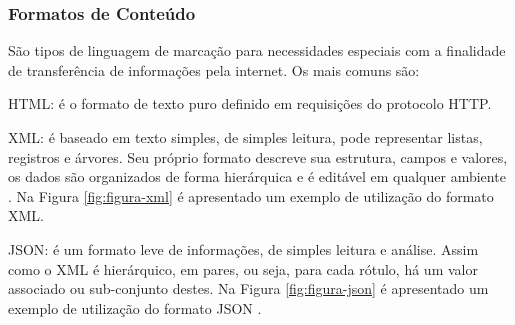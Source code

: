     	\subsubsection{Formatos de Conteúdo}
    	\label{sec:formatos-de-conteudo}
    	São tipos de linguagem de marcação para necessidades especiais com a finalidade de transferência de informações pela internet. Os mais comuns são:
    	
        \begin{alineascomponto}
        	\item \gls{HTML}: é o formato de texto puro definido em requisições do protocolo \gls{HTTP}.
            \item \gls{XML}:  é baseado em texto simples, de simples leitura, pode representar listas, registros e árvores. Seu próprio formato descreve sua estrutura, campos e valores, os dados são organizados de forma hierárquica e é editável em qualquer ambiente \cite{XML}. Na Figura \ref{fig:figura-xml} é apresentado um exemplo de utilização do formato \gls{XML}.

            \item \gls{JSON}: é um formato leve de informações, de simples leitura e análise. Assim como o \gls{XML} é hierárquico, em pares, ou seja, para cada rótulo, há um valor associado ou sub-conjunto destes. Na Figura \ref{fig:figura-json} é apresentado um exemplo de utilização do formato \gls{JSON} \cite{JSON}.
            
                \begin{figure}[!h]
        	    \end{figure}
            

\end{alineascomponto}
